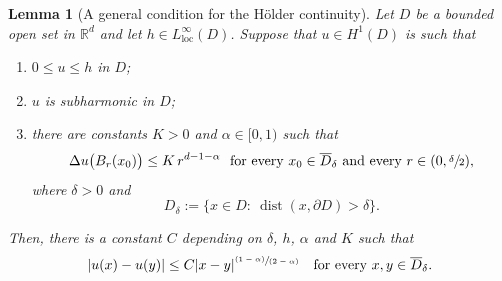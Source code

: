 \documentclass[JEP,XML,SOM,Unicode]{cedram}
\newenvironment{enumeratea}
{\bgroup\def\theenumi{\alph{enumi}}\begin{enumerate}}
{\end{enumerate}\egroup}
\newcommand{\pspfrac}[2]{\sfrac{(#1)}{(#2)}}
\newcommand{\loc}{\mathrm{loc}}
\DeclareMathOperator{\dist}{dist}
\theoremstyle{plain}
\newtheorem{lemma}[teo]{Lemma}
\theoremstyle{definition}
\def\R{\mathbb{R}}
\begin{document}
\begin{lemma}[A general condition for the Hölder continuity]\label{l:holder}
Let $D$ be a bounded open set in $\R^d$ and let $h\in L^\infty_{\loc}(D)$.
Suppose that $u\in H^1(D)$ is such that
\begin{enumeratea}
\item $0\le u\le h$ in $D$;
\item $u$ is subharmonic in $D$;
\item there are constants $K>0$ and $\alpha\in[0,1)$ such that
\begin{equation}\label{e:opt_cond_balls}
\Delta u\big(B_r(x_0)\big)\le K\,r^{d-1-\alpha}\ \text{ for every } x_0\in \overline D_\delta\text{ and every $r\in(0,\sfrac\delta2)$},
\end{equation}
where $\delta>0$ and
\begin{equation}\label{e:Ddelta}
D_\delta:=\big\{x\in D:\ \dist(x,\partial D)> \delta\big\}.
\end{equation}
\end{enumeratea}
Then, there is a constant $C$ depending on $\delta$, $h$, $\alpha$ and $K$ such that
\[|u(x)-u(y)|\le C|x-y|^{\pspfrac{1-\alpha}{2-\alpha}}\quad\text{for every } x,y\in \overline D_\delta.\]
\end{lemma}
\end{document}
